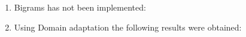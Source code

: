 \documentclass[12pt]{article}
\begin{document}
\begin{enumerate}[label=(\alph*)]
    \item Bigrams has not been implemented:



    \item Using Domain adaptation the following results were obtained:

          \begin{enumerate}[label=\roman*.]
              \begin{itemize}


\end{itemize}
\end{enumerate}
\end{enumerate}
\end{document}
